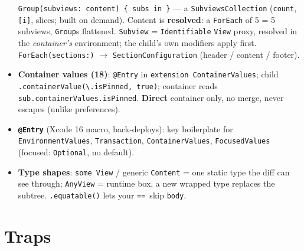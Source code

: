 \documentclass[8pt]{extarticle}
\newcommand\eqeq{\texttt{\hbox{=}\hbox{=}}}
\begin{document}
\begin{multicols}{2}
\begin{itemize}
        \texttt{Group(subviews: content) \{ subs in \}} — a \texttt{SubviewsCollection} (\texttt{count},
        \texttt{[i]}, slices; built on demand). Content is \textbf{resolved}: a \texttt{ForEach} of 5 = 5
        subviews, \texttt{Group}s flattened. \texttt{Subview} = \texttt{Identifiable} \texttt{View} proxy,
        resolved in the \emph{container's} environment; the child's own modifiers apply first.
        \texttt{ForEach(sections:)} $\to$ \texttt{SectionConfiguration} (header / content / footer).
  \item \textbf{Container values (18)}: \texttt{@Entry} in \texttt{extension ContainerValues}; child
        \texttt{.containerValue(\textbackslash.isPinned, true)}; container reads
        \texttt{sub.containerValues.isPinned}. \textbf{Direct} container only, no merge, never escapes
        (unlike preferences).
  \item \textbf{\texttt{@Entry}} (Xcode 16 macro, back-deploys): key boilerplate for
        \texttt{EnvironmentValues}, \texttt{Transaction}, \texttt{ContainerValues}, \texttt{FocusedValues}
        (focused: \texttt{Optional}, no default).
  \item \textbf{Type shapes}: \texttt{some View} / generic \texttt{Content} = one static type the diff can
        see through; \texttt{AnyView} = runtime box, a new wrapped type replaces the subtree.
        \texttt{.equatable()} lets your \eqeq\ skip \texttt{body}.
\end{itemize}

\section{Traps}
\begin{itemize}
\end{itemize}


\end{multicols}
\end{document}
